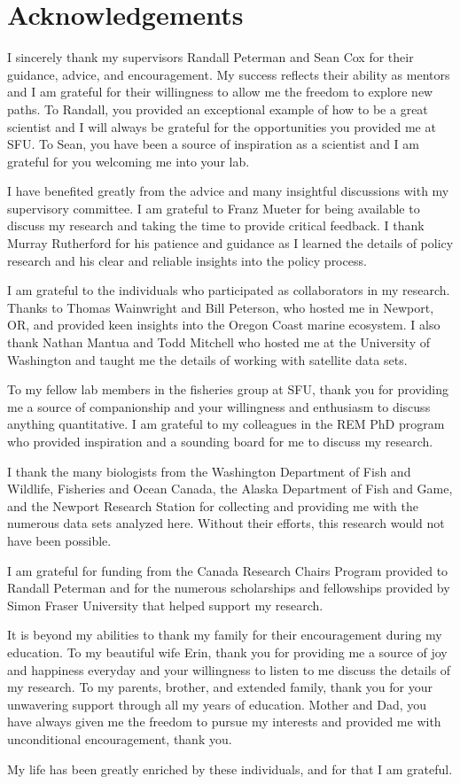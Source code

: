 

\chapter*{Acknowledgements}

I sincerely thank my supervisors Randall Peterman and Sean Cox for their
guidance, advice, and encouragement. My success reflects their ability as
mentors and I am grateful for their willingness to allow me the freedom to
explore new paths. To Randall, you provided an exceptional example of how to be
a great scientist and I will always be grateful for the opportunities you
provided me at SFU. To Sean, you have been a source of inspiration as a
scientist and I am grateful for you welcoming me into your lab.

I have benefited greatly from the advice and many insightful discussions with my
supervisory committee. I am grateful to Franz Mueter for being available to
discuss my research and taking the time to provide critical feedback. I thank
Murray Rutherford for his patience and guidance as I learned the details of
policy research and his clear and reliable insights into the policy process.

I am grateful to the individuals who participated as collaborators in my
research. Thanks to Thomas Wainwright and Bill Peterson, who hosted me in
Newport, OR, and provided keen insights into the Oregon Coast marine ecosystem.
I also thank Nathan Mantua and Todd Mitchell who hosted me at the University of
Washington and taught me the details of working with satellite data sets.

To my fellow lab members in the fisheries group at SFU, thank you for providing
me a source of companionship and your willingness and enthusiasm to discuss
anything quantitative. I am grateful to my colleagues in the REM PhD program who
provided inspiration and a sounding board for me to discuss my research.

I thank the many biologists from the Washington Department of Fish and Wildlife,
Fisheries and Ocean Canada, the Alaska Department of Fish and Game, and the
Newport Research Station for collecting and providing me with the numerous data
sets analyzed here. Without their efforts, this research would not have been
possible.

I am grateful for funding from the Canada Research Chairs Program provided to
Randall Peterman and for the numerous scholarships and fellowships provided by
Simon Fraser University that helped support my research.

It is beyond my abilities to thank my family for their encouragement during my
education. To my beautiful wife Erin, thank you for providing me a source of joy
and happiness everyday and your willingness to listen to me discuss the details
of my research. To my parents, brother, and extended family, thank you for your
unwavering support through all my years of education. Mother and Dad, you have
always given me the freedom to pursue my interests and provided me with
unconditional encouragement, thank you.

My life has been greatly enriched by these individuals, and for that I am
grateful.
